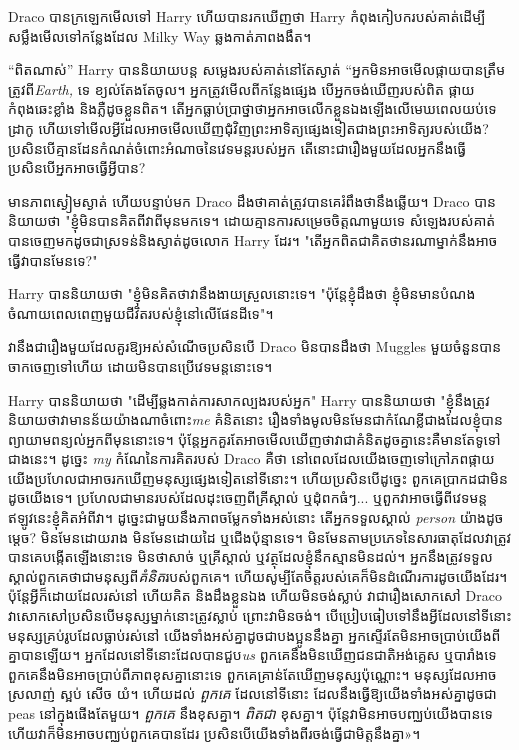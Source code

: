 {{{{{{{{Draco បានក្រឡេកមើលទៅ Harry ហើយបានរកឃើញថា Harry កំពុងកៀបករបស់គាត់ដើម្បីសម្លឹងមើលទៅកន្លែងដែល Milky Way ឆ្លងកាត់ភាពងងឹត។

“ពិតណាស់” Harry បាននិយាយបន្ត សម្លេងរបស់គាត់នៅតែស្ងាត់ “អ្នកមិនអាចមើលផ្កាយបានត្រឹមត្រូវពី\emph{Earth,} ទេ ខ្យល់តែងតែចូល។ អ្នកត្រូវមើលពីកន្លែងផ្សេង បើអ្នកចង់ឃើញរបស់ពិត ផ្កាយកំពុងឆេះខ្លាំង និងភ្លឺដូចខ្លួនពិត។ តើ​អ្នក​ធ្លាប់​ប្រាថ្នា​ថា​អ្នក​អាច​លើក​ខ្លួន​ឯង​ឡើង​លើ​មេឃ​ពេល​យប់​ទេ ដ្រាកូ ហើយ​ទៅ​មើល​អ្វី​ដែល​អាច​មើល​ឃើញ​ជុំវិញ​ព្រះអាទិត្យ​ផ្សេង​ទៀត​ជាង​ព្រះអាទិត្យ​របស់​យើង? ប្រសិនបើគ្មានដែនកំណត់ចំពោះអំណាចនៃវេទមន្តរបស់អ្នក តើនោះជារឿងមួយដែលអ្នកនឹងធ្វើ ប្រសិនបើអ្នកអាចធ្វើអ្វីបាន?

មានភាពស្ងៀមស្ងាត់ ហើយបន្ទាប់មក Draco ដឹងថាគាត់ត្រូវបានគេរំពឹងថានឹងឆ្លើយ។ Draco បាននិយាយថា "ខ្ញុំមិនបានគិតពីវាពីមុនមកទេ។ ដោយ​គ្មាន​ការ​សម្រេច​ចិត្ត​ណា​មួយ​ទេ សំឡេង​របស់​គាត់​បាន​ចេញ​មក​ដូច​ជា​ស្រទន់​និង​ស្ងាត់​ដូច​លោក Harry ដែរ។ "តើអ្នកពិតជាគិតថានរណាម្នាក់នឹងអាចធ្វើវាបានមែនទេ?"

Harry បាននិយាយថា "ខ្ញុំមិនគិតថាវានឹងងាយស្រួលនោះទេ។ "ប៉ុន្តែខ្ញុំដឹងថា ខ្ញុំមិនមានបំណងចំណាយពេលពេញមួយជីវិតរបស់ខ្ញុំនៅលើផែនដីទេ"។

វា​នឹង​ជា​រឿង​មួយ​ដែល​គួរ​ឱ្យ​អស់​សំណើច​ប្រសិន​បើ Draco មិន​បាន​ដឹង​ថា Muggles មួយ​ចំនួន​បាន​ចាកចេញ​ទៅ​ហើយ ដោយ​មិន​បាន​ប្រើ​វេទមន្ត​នោះ​ទេ។

Harry បាននិយាយថា "ដើម្បីឆ្លងកាត់ការសាកល្បងរបស់អ្នក" Harry បាននិយាយថា "ខ្ញុំនឹងត្រូវនិយាយថាវាមានន័យយ៉ាងណាចំពោះ\emph{me} គំនិតនោះ រឿងទាំងមូលមិនមែនជាកំណែខ្លីជាងដែលខ្ញុំបានព្យាយាមពន្យល់អ្នកពីមុននោះទេ។ ប៉ុន្តែ​អ្នក​គួរ​តែ​អាច​មើល​ឃើញ​ថា​វា​ជា​គំនិត​ដូច​គ្នា​នេះ​គឺ​មាន​តែ​ទូទៅ​ជាង​នេះ​។ ដូច្នេះ \emph{my} កំណែនៃការគិតរបស់ Draco គឺថា នៅពេលដែលយើងចេញទៅក្រៅភពផ្កាយ យើងប្រហែលជាអាចរកឃើញមនុស្សផ្សេងទៀតនៅទីនោះ។ ហើយ​ប្រសិន​បើ​ដូច្នេះ ពួក​គេ​ប្រាកដ​ជា​មិន​ដូច​យើង​ទេ។ ប្រហែលជាមានរបស់ដែលដុះចេញពីគ្រីស្តាល់ ឬដុំពកធំៗ... ឬពួកវាអាចធ្វើពីវេទមន្ត ឥឡូវនេះខ្ញុំគិតអំពីវា។ ដូច្នេះជាមួយនឹងភាពចម្លែកទាំងអស់នោះ តើអ្នកទទួលស្គាល់ \emph{person} យ៉ាងដូចម្តេច? មិន​មែន​ដោយ​រាង មិន​មែន​ដោយ​ដៃ ឬ​ជើង​ប៉ុន្មាន​ទេ។ មិន​មែន​តាម​ប្រភេទ​នៃ​សារធាតុ​ដែល​វា​ត្រូវ​បាន​គេ​បង្កើត​ឡើង​នោះ​ទេ មិន​ថា​សាច់ ឬ​គ្រីស្តាល់ ឬ​វត្ថុ​ដែល​ខ្ញុំ​នឹក​ស្មាន​មិន​ដល់។ អ្នកនឹងត្រូវទទួលស្គាល់ពួកគេថាជាមនុស្សពី\emph{គំនិត}របស់ពួកគេ។ ហើយសូម្បីតែចិត្តរបស់គេក៏មិនដំណើរការដូចយើងដែរ។ ប៉ុន្តែអ្វីក៏ដោយដែលរស់នៅ ហើយគិត និងដឹងខ្លួនឯង ហើយមិនចង់ស្លាប់ វាជារឿងសោកសៅ Draco វាសោកសៅប្រសិនបើមនុស្សម្នាក់នោះត្រូវស្លាប់ ព្រោះវាមិនចង់។ បើប្រៀបធៀបទៅនឹងអ្វីដែលនៅទីនោះ មនុស្សគ្រប់រូបដែលធ្លាប់រស់នៅ យើងទាំងអស់គ្នាដូចជាបងប្អូននឹងគ្នា អ្នកស្ទើរតែមិនអាចប្រាប់យើងពីគ្នាបានឡើយ។ អ្នកដែលនៅទីនោះដែលបានជួប\emph{us} ពួកគេនឹងមិនឃើញជនជាតិអង់គ្លេស ឬបារាំងទេ ពួកគេនឹងមិនអាចប្រាប់ពីភាពខុសគ្នានោះទេ ពួកគេគ្រាន់តែឃើញមនុស្សប៉ុណ្ណោះ។ មនុស្សដែលអាចស្រលាញ់ ស្អប់ សើច យំ។ ហើយដល់ \emph{ពួកគេ} ដែលនៅទីនោះ ដែលនឹងធ្វើឱ្យយើងទាំងអស់គ្នាដូចជា peas នៅក្នុងផើងតែមួយ។ \emph{ពួកគេ} នឹងខុសគ្នា។ \emph{ពិតជា} ខុសគ្នា។ ប៉ុន្តែ​វា​មិន​អាច​បញ្ឈប់​យើង​បាន​ទេ ហើយ​វា​ក៏​មិន​អាច​បញ្ឈប់​ពួកគេ​បាន​ដែរ ប្រសិន​បើ​យើង​ទាំង​ពីរ​ចង់​ធ្វើ​ជា​មិត្ត​នឹង​គ្នា»។

}}}}}}}}
